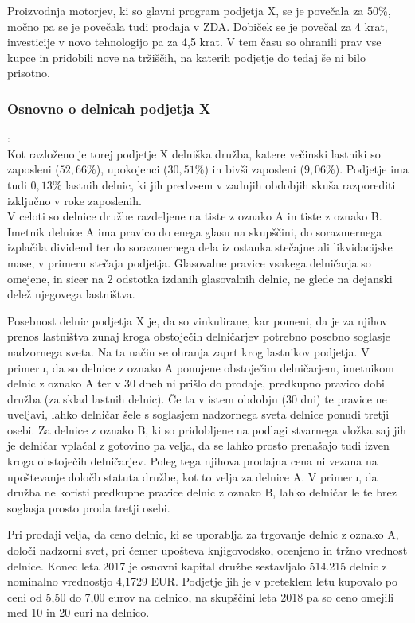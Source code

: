 \documentclass[12pt,a4paper]{amsart}
\theoremstyle{definition} %
\theoremstyle{plain} %
\begin{document}
Proizvodnja motorjev, ki so glavni program podjetja X, se je povečala za 50\%, močno pa se je povečala tudi prodaja v ZDA. Dobiček se je povečal za 4 krat, investicije v novo tehnologijo pa za 4,5 krat. V tem času so ohranili prav vse kupce in pridobili nove na tržiščih, na katerih podjetje do tedaj še ni bilo prisotno.

\subsubsection{Osnovno o delnicah podjetja X}:\\

Kot razloženo je torej podjetje X delniška družba, katere večinski lastniki so zaposleni ($52,66\%$), upokojenci ($30,51\%$) in bivši zaposleni ($9,06\%$). Podjetje ima tudi $0,13\%$ lastnih delnic, ki jih predvsem v zadnjih obdobjih skuša razporediti izključno v roke zaposlenih.\\
V celoti so delnice družbe razdeljene na tiste z oznako A in tiste z oznako B. Imetnik delnice A ima pravico do enega glasu na skupščini, do sorazmernega izplačila dividend ter do sorazmernega dela iz ostanka stečajne ali likvidacijske mase, v primeru stečaja podjetja. Glasovalne pravice vsakega delničarja so omejene, in sicer na 2 odstotka izdanih glasovalnih delnic, ne glede na dejanski delež njegovega lastništva.\par
Posebnost delnic podjetja X je, da so vinkulirane, kar pomeni, da je za njihov prenos lastništva zunaj kroga obstoječih delničarjev potrebno posebno soglasje nadzornega sveta. Na ta način se ohranja zaprt krog lastnikov podjetja. V primeru, da so delnice z oznako A ponujene obstoječim delničarjem, imetnikom delnic z oznako A ter v 30 dneh ni prišlo do prodaje, predkupno pravico dobi družba (za sklad lastnih delnic). Če ta v istem obdobju (30 dni) te pravice ne uveljavi, lahko delničar šele s soglasjem nadzornega sveta delnice ponudi tretji osebi.
Za delnice z oznako B, ki so pridobljene na podlagi stvarnega vložka saj jih je delničar vplačal z gotovino pa velja, da se lahko prosto prenašajo tudi izven kroga obstoječih delničarjev. Poleg tega njihova prodajna cena ni vezana na upoštevanje določb statuta družbe, kot to velja za delnice A. V primeru, da družba ne koristi predkupne pravice delnic z oznako B, lahko delničar le te brez soglasja prosto proda tretji osebi.\par
Pri prodaji velja, da ceno delnic, ki se uporablja za trgovanje delnic z oznako A, določi nadzorni svet, pri čemer upošteva knjigovodsko, ocenjeno in tržno vrednost delnice. Konec leta 2017 je osnovni kapital družbe sestavljalo 514.215 delnic z nominalno vrednostjo 4,1729 EUR. Podjetje jih je v preteklem letu kupovalo po ceni od 5,50 do 7,00 eurov na delnico, na skupščini leta 2018 pa so ceno omejili med 10 in 20 euri na delnico.
\end{document}
